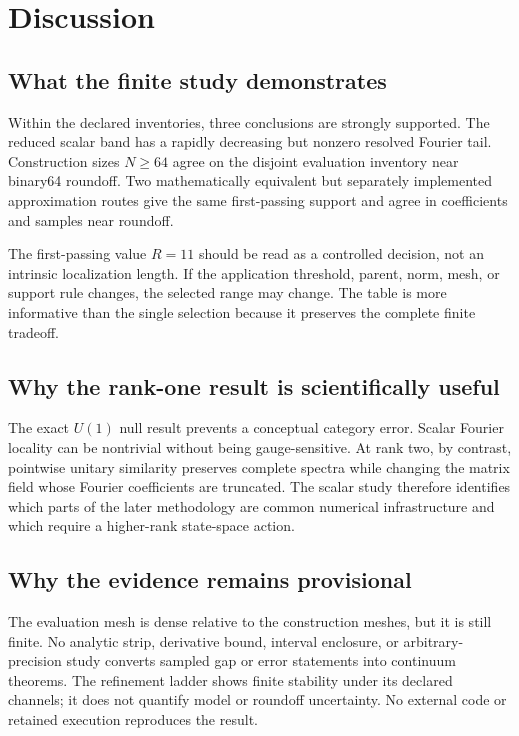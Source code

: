 \documentclass[11pt]{article}
\begin{document}
\section{Discussion}

\subsection{What the finite study demonstrates}

Within the declared inventories, three conclusions are strongly supported.  The reduced
scalar band has a rapidly decreasing but nonzero resolved Fourier tail.  Construction
sizes $N\ge64$ agree on the disjoint evaluation inventory near binary64 roundoff.  Two
mathematically equivalent but separately implemented approximation routes give the same
first-passing support and agree in coefficients and samples near roundoff.

The first-passing value $R=11$ should be read as a controlled decision, not an intrinsic
localization length.  If the application threshold, parent, norm, mesh, or support rule
changes, the selected range may change.  The table is more informative than the single
selection because it preserves the complete finite tradeoff.

\subsection{Why the rank-one result is scientifically useful}

The exact $U(1)$ null result prevents a conceptual category error.  Scalar Fourier
locality can be nontrivial without being gauge-sensitive.  At rank two, by contrast,
pointwise unitary similarity preserves complete spectra while changing the matrix field
whose Fourier coefficients are truncated.  The scalar study therefore identifies which
parts of the later methodology are common numerical infrastructure and which require a
higher-rank state-space action.

\subsection{Why the evidence remains provisional}

The evaluation mesh is dense relative to the construction meshes, but it is still
finite.  No analytic strip, derivative bound, interval enclosure, or arbitrary-precision
study converts sampled gap or error statements into continuum theorems.  The refinement
ladder shows finite stability under its declared channels; it does not quantify model or
roundoff uncertainty.  No external code or retained execution reproduces the result.
\end{document}
